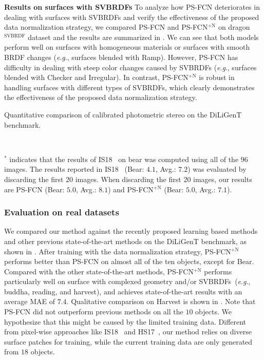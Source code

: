 \documentclass[10pt,journal,compsoc]{IEEEtran}
\newcommand{\eg}{\textit{e}.\textit{g}.}
\newcommand{\rev}[1]{#1}
\renewcommand{\paragraph}[1]{\vspace{0.2em}\noindent \textbf{#1 \hspace{0.2em}}}
\begin{document}
\paragraph{Results on surfaces with SVBRDFs} 
To analyze how PS-FCN deteriorates in dealing with surfaces with SVBRDFs and verify the effectiveness of the proposed data normalization strategy, we compared PS-FCN and PS-FCN$^\text{+N}$ on {\sc dragon}$^{\text{SVBRDF}}$ dataset and the results are summarized in . We can see that both models perform well on surfaces with homogeneous materials or surfaces with smooth BRDF changes (\eg, surfaces blended with Ramp). However, PS-FCN has difficulty in dealing with steep color changes caused by SVBRDFs (\eg, surfaces blended with Checker and Irregular). In contrast, PS-FCN$^\text{+N}$ is robust in handling surfaces with different types of SVBRDFs, which clearly demonstrates the effectiveness of the proposed data normalization strategy.

\begin{table}[t]
    \caption{Quantitative comparison of calibrated photometric stereo on the DiLiGenT benchmark.} \label{tab:quant_main}
     \\
    \begin{flushleft}
    {\scriptsize $^*$ indicates that the results of IS18~\cite{ikehata2018cnn} on {\sc bear} was computed using all of the $96$ images. The results reported in IS18~\cite{ikehata2018cnn} ({\sc Bear}: $4.1$, Avg.: $7.2$) was evaluated by discarding the first $20$ images. When discarding the first $20$ images, our results are PS-FCN ({\sc Bear}: $5.0$, Avg.: $8.1$) and PS-FCN$^\text{+N}$ ({\sc Bear}: $5.0$, Avg.: $7.1$).}
    \end{flushleft}
\end{table}

\subsubsection{Evaluation on real datasets}
We compared our method against the recently proposed learning based methods~\cite{santo2017deep,Taniai18,ikehata2018cnn} and other previous state-of-the-art methods on the DiLiGenT benchmark, as shown in . 
After training with the data normalization strategy, PS-FCN$^{+\text{N}}$ performs better than PS-FCN on almost all of the ten objects, except for {\sc Bear}. 
Compared with the other state-of-the-art methods, PS-FCN$^{+\text{N}}$ performs particularly well on surface with complexed geometry and/or SVBRDFs~(\eg, {\sc buddha}, {\sc reading}, and {\sc harvest}), and achieves state-of-the-art results with an average MAE of $7.4$.
Qualitative comparison on {\sc Harvest} is shown in .
\rev{Note that PS-FCN did not outperform previous methods on all the $10$ objects. We hypothesize that this might be caused by the limited training data. Different from pixel-wise approaches like IS18~\cite{ikehata2018cnn} and HS17~\cite{hui2017shape}, our method relies on diverse surface patches for training, while the current training data are only generated from $18$ objects.}
\end{document}
